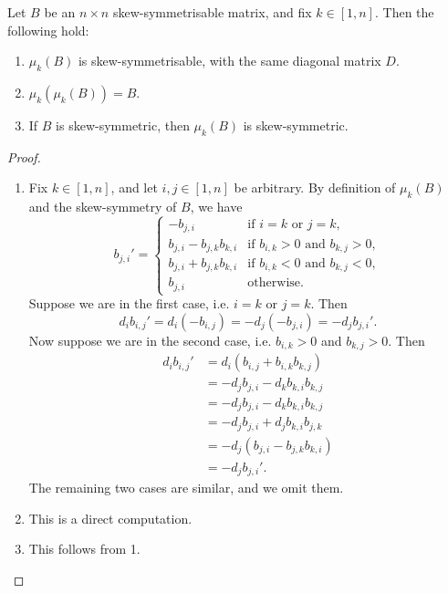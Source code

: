 \begin{proposition}
    Let $B$ be an $n \times n$ skew-symmetrisable matrix, and fix $k \in [1,n]$. Then the following hold:
    \begin{enumerate}
        \item $\mu_k(B)$ is skew-symmetrisable, with the same diagonal matrix $D$.
        \item $\mu_k(\mu_k(B)) = B$.
        \item If $B$ is skew-symmetric, then $\mu_k(B)$ is skew-symmetric.
    \end{enumerate}
\end{proposition}
\begin{proof}
    \begin{enumerate}   
        \item Fix $k \in [1,n]$, and let $i,j \in [1,n]$ be arbitrary. By definition of $\mu_k(B)$ and the 
        skew-symmetry of $B$, we have
\[
        b_{j,i}' = \begin{cases}
            -b_{j,i} & \text{if } i = k \text{ or } j = k, \\
            b_{j,i} - b_{j,k}b_{k,i} & \text{if } b_{i,k} >0 \text{ and } b_{k,j} > 0, \\
            b_{j,i} + b_{j,k}b_{k,i} & \text{if } b_{i,k} <0 \text{ and } b_{k,j} < 0, \\
            b_{j,i} & \text{otherwise.}
        \end{cases}
\]
Suppose we are in the first case, i.e. $i=k$ or $j = k$. Then 
\[
        d_i b_{i,j}' = d_i (-b_{i,j}) = - d_j (- b_{j,i}) = - d_j b_{j,i}'.
\]
Now suppose we are in the second case, i.e. $b_{i,k} > 0$ and $b_{k,j} > 0$. Then
\begin{align*}
        d_i b_{i,j}' &= d_i (b_{i,j} + b_{i,k}b_{k,j})\\
                    &= - d_j b_{j,i} - d_k b_{k,i}b_{k,j} \\
                    &= - d_j b_{j,i} - d_k b_{k,i}b_{k,j} \\
                    &= - d_j b_{j,i} + d_j b_{k,i}b_{j,k} \\
                    &= - d_j (b_{j,i} - b_{j,k}b_{k,i}) \\
                    &= - d_j b_{j,i}'.
\end{align*}
The remaining two cases are similar, and we omit them. 
        \item This is a direct computation.
        \item This follows from 1. 
    \end{enumerate}
\end{proof}